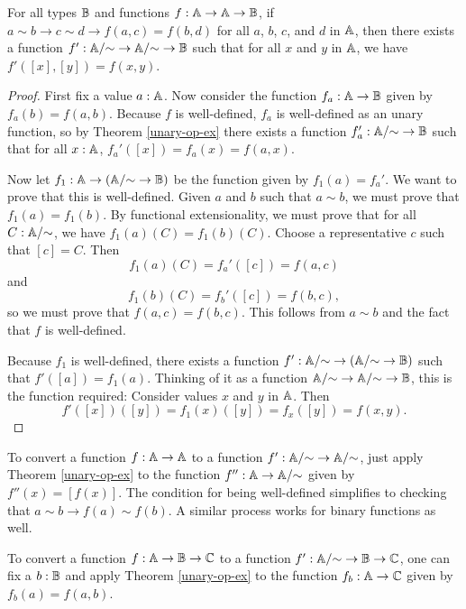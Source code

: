 \documentclass[../math.tex]{subfiles}
\begin{document}
\begin{theorem} \label{binary-op-ex}
    For all types $\mathbb{B}$ and functions $f : \mathbb{A} \to \mathbb{A} \to \mathbb{B}$, if $a \sim b \to c
    \sim d \to f(a, c) = f(b, d)$ for all $a$, $b$, $c$, and $d$ in $\mathbb{A}$, then
    there exists a function $f' : \mathbb{A}/{\sim} \to \mathbb{A}/{\sim} \to \mathbb{B}$ such that for
    all $x$ and $y$ in $\mathbb{A}$, we have $f'([x], [y]) = f(x, y)$.
\end{theorem}
\begin{proof}
    First fix a value $a : \mathbb{A}$.  Now consider the function $f_a : \mathbb{A} \to \mathbb{B}$
    given by $f_a(b) = f(a, b)$.  Because $f$ is well-defined, $f_a$ is
    well-defined as an unary function, so by Theorem \ref{unary-op-ex} there
    exists a function $f_a' : \mathbb{A}/{\sim} \to \mathbb{B}$ such that for all $x : \mathbb{A}$,
    $f_a'([x]) = f_a(x) = f(a, x)$.

    Now let $f_1 : \mathbb{A} \to (\mathbb{A}/{\sim} \to \mathbb{B})$ be the function given by $f_1(a) =
    f_a'$.  We want to prove that this is well-defined.  Given $a$ and $b$ such
    that $a \sim b$, we must prove that $f_1(a) = f_1(b)$.  By functional
    extensionality, we must prove that for all $C : \mathbb{A}/{\sim}$, we have
    $f_1(a)(C) = f_1(b)(C)$.  Choose a representative $c$ such that $[c] = C$.
    Then
    \[
        f_1(a)(C) = f_a'([c]) = f(a, c)
    \]
    and
    \[
        f_1(b)(C) = f_b'([c]) = f(b, c),
    \]
    so we must prove that $f(a, c) = f(b, c)$.  This follows from $a \sim b$ and
    the fact that $f$ is well-defined.

    Because $f_1$ is well-defined, there exists a function $f' : \mathbb{A}/{\sim} \to
    (\mathbb{A}/{\sim} \to \mathbb{B})$ such that $f'([a]) = f_1(a)$.  Thinking of it as a
    function $\mathbb{A}/{\sim} \to \mathbb{A}/{\sim} \to \mathbb{B}$, this is the function required:
    Consider values $x$ and $y$ in $\mathbb{A}$.  Then
    \[
        f'([x])([y]) = f_1(x)([y]) = f_x([y]) = f(x, y).
    \]
\end{proof}

To convert a function $f : \mathbb{A} \to \mathbb{A}$ to a function $f' : \mathbb{A}/{\sim} \to
\mathbb{A}/{\sim}$, just apply Theorem \ref{unary-op-ex} to the function $f'' : \mathbb{A} \to
\mathbb{A}/{\sim}$ given by $f''(x) = [f(x)]$.  The condition for being well-defined
simplifies to checking that $a \sim b \to f(a) \sim f(b)$.  A similar process
works for binary functions as well.

To convert a function $f : \mathbb{A} \to \mathbb{B} \to \mathbb{C}$ to a function $f' : \mathbb{A}/{\sim} \to \mathbb{B}
\to \mathbb{C}$, one can fix a $b : \mathbb{B}$ and apply Theorem \ref{unary-op-ex} to the
function $f_b : \mathbb{A} \to \mathbb{C}$ given by $f_b(a) = f(a, b)$.
\end{document}

